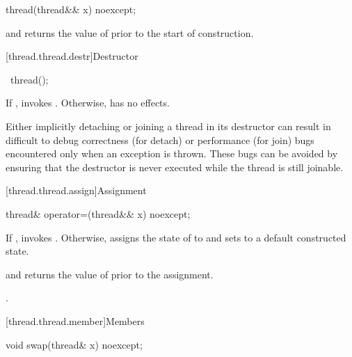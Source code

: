 %
\begin{itemdecl}
thread(thread&& x) noexcept;
\end{itemdecl}

\begin{itemdescr}
\pnum
\ensures
{} and  returns the
value of  prior to the start of construction.
\end{itemdescr}

[thread.thread.destr]{Destructor}

%
\begin{itemdecl}
~thread();
\end{itemdecl}

\begin{itemdescr}
\pnum
\effects
If , invokes .
Otherwise, has no effects.
\begin{note}
Either implicitly detaching or joining a  thread in its
destructor can result in difficult to debug correctness (for detach) or performance
(for join) bugs encountered only when an exception is thrown.
These bugs can be avoided by ensuring that
the destructor is never executed while the thread is still joinable.
\end{note}
\end{itemdescr}

[thread.thread.assign]{Assignment}

%
\begin{itemdecl}
thread& operator=(thread&& x) noexcept;
\end{itemdecl}

\begin{itemdescr}
\pnum
\effects
If , invokes .
Otherwise, assigns the
state of  to  and sets  to a default constructed state.

\pnum
\ensures
{} and  returns the value of
 prior to the assignment.

\pnum
\returns
{}.
\end{itemdescr}

[thread.thread.member]{Members}

%
\begin{itemdecl}
void swap(thread& x) noexcept;
\end{itemdecl}

